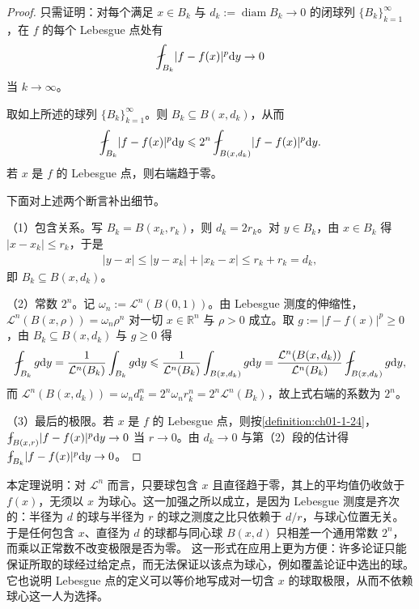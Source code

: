 \documentclass[../../main.tex]{subfiles}%
\begin{document}
\begin{proof}
只需证明：对每个满足 $x\in B_k$ 与 $d_k:=\operatorname{diam}B_k\to0$ 的闭球列 $\{B_k\}_{k=1}^{\infty}$，在 $f$ 的每个 Lebesgue 点处有
\begin{align*}
\fint_{B_k}\lvert f-f(x)\rvert^{p}\diff y\to0
\end{align*}
当 $k\to\infty$。

取如上所述的球列 $\{B_k\}_{k=1}^{\infty}$。则 $B_k\subseteq B(x,d_k)$，从而
\begin{align*}
\fint_{B_k}\lvert f-f(x)\rvert^{p}\diff y\leqslant2^{n}\fint_{B(x,d_k)}\lvert f-f(x)\rvert^{p}\diff y .
\end{align*}
若 $x$ 是 $f$ 的 Lebesgue 点，则右端趋于零。

下面对上述两个断言补出细节。

（1）包含关系。写 $B_k=B(x_k,r_k)$，则 $d_k=2r_k$。对 $y\in B_k$，由 $x\in B_k$ 得 $\lvert x-x_k\rvert\leqslant r_k$，于是
\begin{align*}
\lvert y-x\rvert\leqslant\lvert y-x_k\rvert+\lvert x_k-x\rvert\leqslant r_k+r_k=d_k ,
\end{align*}
即 $B_k\subseteq B(x,d_k)$。

（2）常数 $2^{n}$。记 $\omega_n:=\mathcal{L}^{n}(B(0,1))$。由 Lebesgue 测度的伸缩性，$\mathcal{L}^{n}(B(x,\rho))=\omega_n\rho^{n}$ 对一切 $x\in\mathbb{R}^n$ 与 $\rho>0$ 成立。取 $g:=\lvert f-f(x)\rvert^{p}\geqslant0$，由 $B_k\subseteq B(x,d_k)$ 与 $g\geqslant0$ 得
\begin{align*}
\fint_{B_k}g\diff y=\frac{1}{\mathcal{L}^{n}(B_k)}\int_{B_k}g\diff y
\leqslant\frac{1}{\mathcal{L}^{n}(B_k)}\int_{B(x,d_k)}g\diff y
=\frac{\mathcal{L}^{n}(B(x,d_k))}{\mathcal{L}^{n}(B_k)}\fint_{B(x,d_k)}g\diff y ,
\end{align*}
而 $\mathcal{L}^{n}(B(x,d_k))=\omega_nd_k^{n}=2^{n}\omega_nr_k^{n}=2^{n}\mathcal{L}^{n}(B_k)$，故上式右端的系数为 $2^{n}$。

（3）最后的极限。若 $x$ 是 $f$ 的 Lebesgue 点，则按\cref{definition:ch01-1-24}，$\fint_{B(x,r)}\lvert f-f(x)\rvert^{p}\diff y\to0$ 当 $r\to0$。由 $d_k\to0$ 与第（2）段的估计得 $\fint_{B_k}\lvert f-f(x)\rvert^{p}\diff y\to0$。%
\end{proof}

\begin{remark}\label{remark:ch01-thm-1-34-动机}
本定理说明：对 $\mathcal{L}^{n}$ 而言，只要球包含 $x$ 且直径趋于零，其上的平均值仍收敛于 $f(x)$，无须以 $x$ 为球心。这一加强之所以成立，是因为 Lebesgue 测度是齐次的：半径为 $d$ 的球与半径为 $r$ 的球之测度之比只依赖于 $d/r$，与球心位置无关。于是任何包含 $x$、直径为 $d$ 的球都与同心球 $B(x,d)$ 只相差一个通用常数 $2^{n}$，而乘以正常数不改变极限是否为零。
这一形式在应用上更为方便：许多论证只能保证所取的球经过给定点，而无法保证以该点为球心，例如覆盖论证中选出的球。它也说明 Lebesgue 点的定义可以等价地写成对一切含 $x$ 的球取极限，从而不依赖球心这一人为选择。
\end{remark}
\end{document}
